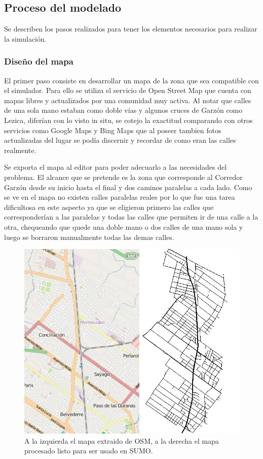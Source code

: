 \subsection{Proceso del modelado}

Se describen los pasos realizados para tener los elementos necesarios para realizar la simulación.

\subsubsection{Diseño del mapa}

El primer paso consiste en desarrollar un mapa de la zona que sea compatible con el simulador. Para ello se utiliza el servicio de Open Street Map \citep{OSM} que cuenta con mapas libres y actualizados por una comunidad muy activa. Al notar que calles de una sola mano estaban como doble vías y algunos cruces de Garzón como Lezica, diferían con lo visto in situ, se cotejo la exactitud comparando con otros servicios como Google Maps y Bing Maps que al poseer tambien fotos actualizadas del lugar se podía discernir y recordar de como eran las calles realmente.

Se exporta el mapa al editor \citet{JOSM} para poder adecuarlo a las necesidades del problema. El alcance que se pretende es la zona que corresponde al Corredor Garzón desde su inicio hasta el final y dos caminos paralelas a cada lado. Como se ve en el mapa no existen calles paralelas reales por lo que fue una tarea dificultosa en este aspecto ya que se eligieron primero las calles que corresponderían a las paralelas y todas las calles que permiten ir de una calle a la otra, chequeando que quede una doble mano o dos calles de una mano sola y luego se borraron manualmente todas las demas calles.

\begin{figure}[H]
	\centering
	\includegraphics[width=0.7\linewidth]{Figures/mapa_osm_sumo}
	\caption{A la izquierda el mapa extraido de OSM, a la derecha el mapa procesado listo para ser usado en SUMO.}
	\label{fig:mapa_osm_sumo}
\end{figure}


